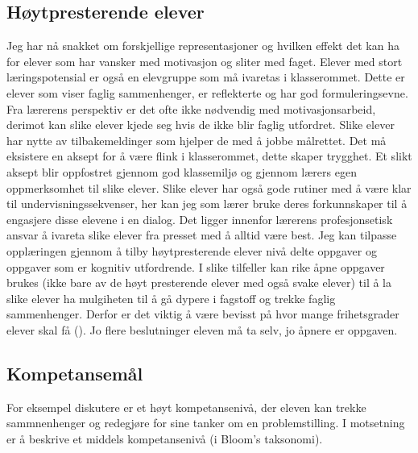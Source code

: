 \documentclass[main.tex]{subfiles}
\begin{document}
\subsection*{Høytpresterende elever}
Jeg har nå snakket om forskjellige representasjoner og hvilken effekt det kan ha for elever som har vansker med motivasjon og sliter med faget. Elever med stort læringspotensial er også en elevgruppe som må ivaretas i klasserommet. Dette er elever som viser faglig sammenhenger, er reflekterte og har god formuleringsevne. Fra lærerens perspektiv er det ofte ikke nødvendig med motivasjonsarbeid, derimot kan slike elever kjede seg hvis de ikke blir faglig utfordret. Slike elever har nytte av tilbakemeldinger som hjelper de med å jobbe målrettet. Det må eksistere en aksept for å være flink i klasserommet, dette skaper trygghet. Et slikt aksept blir oppfostret gjennom god klassemiljø og gjennom lærers egen oppmerksomhet til slike elever. Slike elever har også gode rutiner med å være klar til undervisningssekvenser, her kan jeg som lærer bruke deres forkunnskaper til å engasjere disse elevene i en dialog. Det ligger innenfor lærerens profesjonsetisk ansvar å ivareta slike elever fra presset med å alltid være best. 
\newline\newline
Jeg kan tilpasse opplæringen gjennom å tilby høytpresterende elever nivå delte oppgaver og oppgaver som er kognitiv utfordrende. I slike tilfeller kan rike åpne oppgaver brukes (ikke bare av de høyt presterende elever med også svake elever) til å la slike elever ha mulgiheten til å gå dypere i fagstoff og trekke faglig sammenhenger.  Derfor er det viktig å være bevisst på hvor mange frihetsgrader elever skal få (). Jo flere beslutninger eleven må ta selv, jo åpnere er oppgaven.



\subsection*{Kompetansemål}
For eksempel diskutere er et høyt kompetansenivå, der eleven kan trekke sammnenhenger og redegjøre for sine tanker om en problemstilling. I motsetning er å beskrive et middels kompetansenivå (i Bloom's taksonomi).
\end{document}
